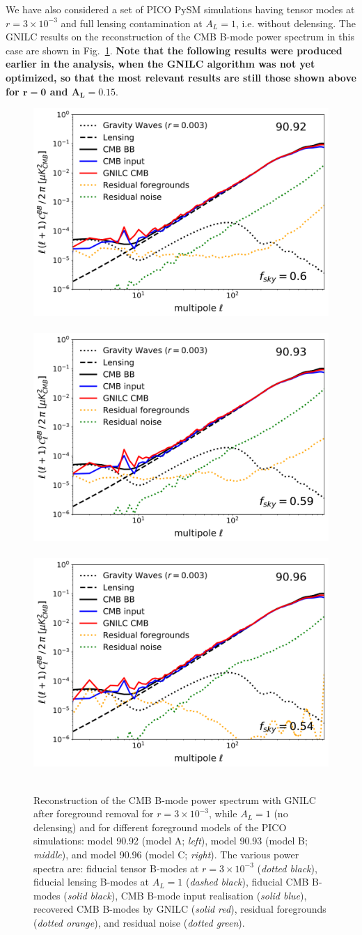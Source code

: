 \documentclass[12pt]{article}
\begin{document}
We have also considered a set of PICO PySM simulations having tensor modes at ${r=3\times 10^{-3}}$ and full lensing contamination at ${A_L=1}$, i.e. without delensing. The GNILC results on the reconstruction of the CMB B-mode power spectrum in this case are shown in Fig.~\ref{Fig:gnilc_ps_r0p003_AL1}. {\bf Note that the following results were produced earlier in the analysis, when the GNILC algorithm was not yet optimized, so that the most relevant results are still those shown above for $\boldsymbol{r=0}$ and $\boldsymbol{A_L=0.15}$}. 
\begin{figure}
  \begin{center}
    \includegraphics[width=0.33\columnwidth]{figures_memo/gnilc_pico_90p92_r0p003_AL1.png}~
     \includegraphics[width=0.33\columnwidth]{figures_memo/gnilc_pico_90p93_r0p003_AL1.png}~
     \includegraphics[width=0.33\columnwidth]{figures_memo/gnilc_pico_90p96_r0p003_AL1.png}~	
  \end{center}
\caption{Reconstruction of the CMB B-mode power spectrum with GNILC after foreground removal for $r=3\times 10^{-3}$, while $A_L=1$ (no delensing) and for different foreground models of the PICO simulations: model 90.92 (model A; \emph{left}), model 90.93 (model B; \emph{middle}), and model 90.96 (model C; \emph{right}). The various power spectra are: fiducial tensor B-modes at $r=3\times 10^{-3}$ (\emph{dotted black}), fiducial lensing B-modes at $A_L=1$ (\emph{dashed black}), fiducial CMB B-modes (\emph{solid black}), CMB B-mode input realisation (\emph{solid blue}), recovered CMB B-modes by GNILC (\emph{solid red}), residual foregrounds (\emph{dotted orange}), and residual noise (\emph{dotted green}).}
\label{Fig:gnilc_ps_r0p003_AL1}
\end{figure}



\end{document}
